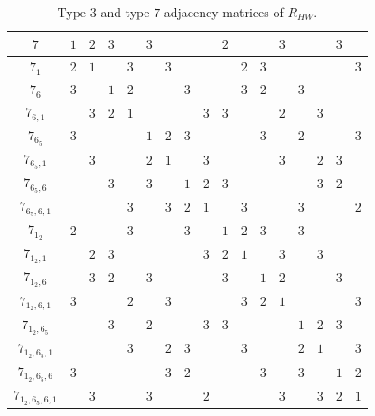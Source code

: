 \documentclass{amsart}
\theoremstyle{definition}
\theoremstyle{remark}
\begin{document}
\begin{table}
\begin{tabular}{|c||c|c|c|c|c|c|c|c|c|c|c|c|c|c|c|c|}
\hhline{|=#=|=|=|=|=|=|=|=|=|=|=|=|=|=|=|=|}
$7$ & $1$ & $2$ & $3$ &  & $3$ &  &  & & $2$ & & & $3$ & & & $3$ & \\ \hline
$7_1$ & $2$ & $1$ &  & $3$ &  & $3$ &  & & & $2$ & $3$ & & & & & $3$ \\ \hline
$7_{6}$ & $3$ &  & $1$ & $2$ &  &  & $3$ & & & $3$ & $2$ & & $3$ & & & \\ \hline
$7_{6,1}$ &  & $3$ & $2$ & $1$ &  &  &  & $3$ & $3$ & & & $2$ & & $3$ & & \\ \hline
$7_{6_5}$ & $3$ &  &  &  & $1$ & $2$ & $3$ & & & & $3$ & & $2$ & & & $3$ \\ \hline
$7_{6_5,1}$ &  & $3$ &  &  & $2$ & $1$ &  & $3$ & & & & $3$ & & $2$ & $3$ & \\ \hline
$7_{6_5,6}$ &  &  & $3$ &  & $3$ &  & $1$ & $2$ & $3$ & & & & & $3$ & $2$ & \\ \hline
$7_{6_5,6,1}$ &  &  &  & $3$ &  & $3$ & $2$ & $1$ & & $3$ & & & $3$ & & & $2$ \\ \hline
$7_{1_2}$ & $2$ & & & $3$ & & & $3$ & & $1$ & $2$ & $3$ & & $3$ & & & \\ \hline
$7_{1_2,1}$ & & $2$ & $3$ & & & & & $3$ & $2$ & $1$ & & $3$ & & $3$ & & \\ \hline
$7_{1_2,6}$ & & $3$ & $2$ & & $3$ & & & & $3$ & & $1$ & $2$ & & & $3$ & \\ \hline
$7_{1_2,6,1}$ & $3$ & & & $2$ & & $3$ & & & & $3$ & $2$ & $1$ & & & & $3$ \\ \hline
$7_{1_2,6_5}$ & & & $3$ & & $2$ & & & $3$ & $3$ & & & & $1$ & $2$ & $3$ & \\ \hline
$7_{1_2,6_5,1}$ & & & & $3$ & & $2$ & $3$ & & & $3$ & & & $2$ & $1$ & & $3$ \\ \hline
$7_{1_2,6_5,6}$ & $3$ & & & & & $3$ & $2$ & & & & $3$ & & $3$ & & $1$ & $2$ \\ \hline
$7_{1_2,6_5,6,1}$ & & $3$ & & & $3$ & & & $2$ & & & & $3$ & & $3$ & $2$ & $1$ \\ \hline
\end{tabular}
\caption{Type-$3$ and type-$7$ adjacency matrices of $R_{HW}$.}\label{tr4}
\end{table}
\end{document}
